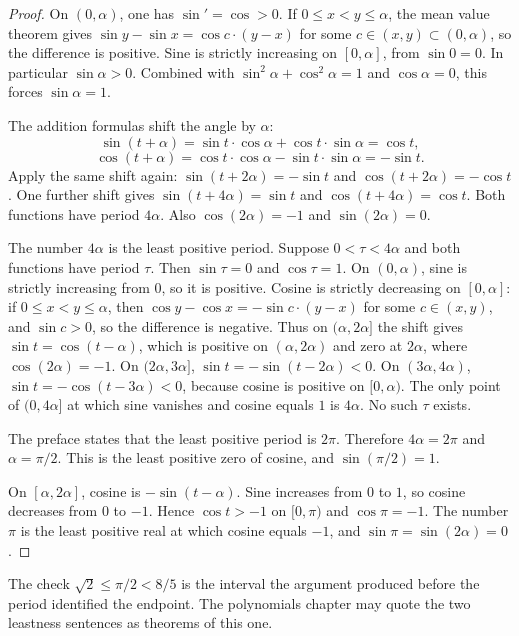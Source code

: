 \begin{proof}
On $(0,\alpha)$, one has $\sin'=\cos>0$. If $0\le x<y\le\alpha$, the mean value theorem gives $\sin y-\sin x=\cos c\cdot(y-x)$ for some $c\in(x,y)\subset(0,\alpha)$, so the difference is positive. Sine is strictly increasing on $[0,\alpha]$, from $\sin 0=0$. In particular $\sin\alpha>0$. Combined with $\sin^2\alpha+\cos^2\alpha=1$ and $\cos\alpha=0$, this forces $\sin\alpha=1$.

The addition formulas shift the angle by $\alpha$:
\[
\sin(t+\alpha)=\sin t\cdot\cos\alpha+\cos t\cdot\sin\alpha=\cos t,
\]
\[
\cos(t+\alpha)=\cos t\cdot\cos\alpha-\sin t\cdot\sin\alpha=-\sin t.
\]
Apply the same shift again: $\sin(t+2\alpha)=-\sin t$ and $\cos(t+2\alpha)=-\cos t$. One further shift gives $\sin(t+4\alpha)=\sin t$ and $\cos(t+4\alpha)=\cos t$. Both functions have period $4\alpha$. Also $\cos(2\alpha)=-1$ and $\sin(2\alpha)=0$.

The number $4\alpha$ is the least positive period. Suppose $0<\tau<4\alpha$ and both functions have period $\tau$. Then $\sin\tau=0$ and $\cos\tau=1$. On $(0,\alpha)$, sine is strictly increasing from $0$, so it is positive. Cosine is strictly decreasing on $[0,\alpha]$: if $0\le x<y\le\alpha$, then $\cos y-\cos x=-\sin c\cdot(y-x)$ for some $c\in(x,y)$, and $\sin c>0$, so the difference is negative. Thus on $(\alpha,2\alpha]$ the shift gives $\sin t=\cos(t-\alpha)$, which is positive on $(\alpha,2\alpha)$ and zero at $2\alpha$, where $\cos(2\alpha)=-1$. On $(2\alpha,3\alpha]$, $\sin t=-\sin(t-2\alpha)<0$. On $(3\alpha,4\alpha)$, $\sin t=-\cos(t-3\alpha)<0$, because cosine is positive on $[0,\alpha)$. The only point of $(0,4\alpha]$ at which sine vanishes and cosine equals $1$ is $4\alpha$. No such $\tau$ exists.

The preface states that the least positive period is $2\pi$. Therefore $4\alpha=2\pi$ and $\alpha=\pi/2$. This is the least positive zero of cosine, and $\sin(\pi/2)=1$.

On $[\alpha,2\alpha]$, cosine is $-\sin(t-\alpha)$. Sine increases from $0$ to $1$, so cosine decreases from $0$ to $-1$. Hence $\cos t>-1$ on $[0,\pi)$ and $\cos\pi=-1$. The number $\pi$ is the least positive real at which cosine equals $-1$, and $\sin\pi=\sin(2\alpha)=0$.
\end{proof}

The check $\sqrt2\le\pi/2<8/5$ is the interval the argument produced before the period identified the endpoint. The polynomials chapter may quote the two leastness sentences as theorems of this one.

